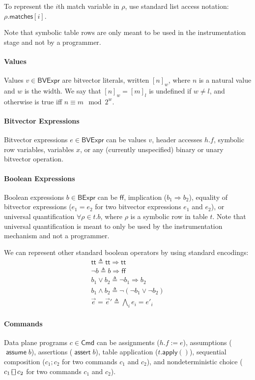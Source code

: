 \documentclass{article}
\newcommand{\TRUE}{\mathsf{tt}}
\newcommand{\FALSE}{\mathsf{ff}}
\newcommand{\BVExpr}{\mathsf{BVExpr}}
\newcommand{\BExpr}{\mathsf{BExpr}}
\newcommand{\matches}{\mathsf{matches}}
\newcommand{\assert}{\mathop{\mathsf{assert}}}
\newcommand{\assume}{\mathop{\mathsf{assume}}}
\newcommand{\apply}{\mathsf{apply}}
\newcommand{\choiceop}{\rotatebox[origin=c]{90}{$\sqsubset\!\!\!\sqsupset$}}
\newcommand{\choice}{\mathbin{\choiceop}}
\begin{document}
To represent the $i$th match variable in $\rho$, use standard list
access notation: $\rho.\matches[i]$.

Note that symbolic table rows are only meant to be used in the instrumentation
stage and not by a programmer.

\paragraph{Values}
Values $v \in \BVExpr$ are bitvector literals, written $[n]_w$, where $n$
is a natural value and $w$ is the width. We say that $[n]_w = [m]_l$ is
undefined if $w \neq l$, and otherwise is true iff $n \equiv m \mod 2^w$.

\paragraph{Bitvector Expressions}
Bitvector expressions $e \in \BVExpr$ can be values $v$, header accesses $h.f$,
symbolic row variables, variables $x$, or any
(currently unspecified) binary or unary bitvector operation.

\paragraph{Boolean Expressions}
Boolean expressions $b \in \BExpr$ can be $\FALSE$, implication ($b_1
\Rightarrow b_2$), equality of bitvector expressions ($e_1 = e_2$ for two
bitvector expressions $e_1$ and $e_2$), or universal quantification $\forall
\rho \in t. b$, where $\rho$ is a symbolic row in table $t$. Note that universal
quantification is meant to only be used by the instrumentation mechanism and not
a programmer.

We can represent other standard boolean operators by using standard encodings:
\[\begin{array}{l}
  \TRUE \triangleq \TRUE \Rightarrow \TRUE \\
  \neg b \triangleq b \Rightarrow \FALSE \\
  b_1 \vee b_2 \triangleq \neg b_1 \Rightarrow b_2 \\
  b_1 \wedge b_2 \triangleq \neg(\neg b_1 \vee \neg b_2) \\
  \vec e = \vec e' \triangleq \bigwedge_i e_i = e'_i
\end{array}\]

\paragraph{Commands}
Data plane programs $c \in \mathsf{Cmd}$ can be assignments ($h.f := e$),
assumptions ($\assume b$), assertions ($\assert b$), table application
($t.\apply()$), sequential composition ($c_1;c_2$ for two commands $c_1$ and $c_2$), and
nondeterministic choice ($c_1 \choice c_2$ for two commands $c_1$ and $c_2$).
\end{document}
